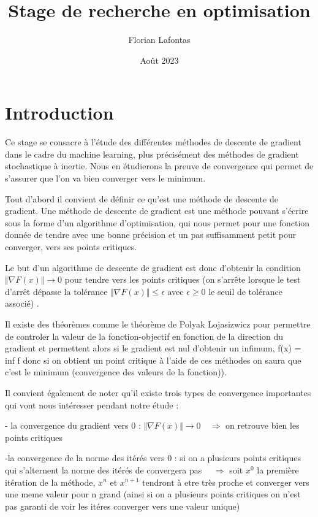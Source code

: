 \documentclass{article}
\title{Stage de recherche en optimisation}
\author{Florian Lafontas}
\date{Août 2023}
\begin{document}
\maketitle
\tableofcontents
\newpage
\section{Introduction}

Ce stage se consacre à l'étude des différentes méthodes de descente de gradient dans le cadre du machine learning, plus précisément des méthodes de gradient stochastique à inertie. Nous en étudierons la preuve de convergence qui permet de s'assurer que l'on va bien converger vers le minimum. 

\bigskip

Tout d'abord il convient de définir ce qu'est une méthode de descente de  gradient. Une méthode de descente de gradient est une méthode pouvant s'écrire sous la forme d'un algorithme d'optimisation, qui nous permet pour une fonction donnée de tendre avec une bonne précision et un pas suffisamment petit pour converger, vers ses points critiques.

\bigskip

Le but d'un algorithme de descente de gradient est donc d'obtenir la condition $ \Vert \nabla F(x)  \Vert \rightarrow 0$ pour tendre vers les points critiques (on s'arrête lorsque le test d'arrêt dépasse la tolérance $ \Vert \nabla F(x)  \Vert \leq \epsilon$ avec $\epsilon \geq 0$ le seuil de tolérance associé) .

\bigskip

Il existe des théorèmes comme le théorème de Polyak Lojasizwicz pour permettre de controler la valeur de la fonction-objectif en fonction de la direction du gradient et permettent alors si le gradient est nul d'obtenir un infimum, f(x) = inf f donc si on obtient un point critique à l'aide de ces méthodes on saura que c’est le minimum (convergence des valeurs de la fonction)).

\bigskip

Il convient également de noter qu'il existe trois types de convergence importantes qui vont nous intéresser pendant notre étude : 

- la convergence du gradient vers 0 :  $ \Vert \nabla F(x)  \Vert \rightarrow 0 \quad \Rightarrow $ on retrouve bien les points critiques

-la convergence de la norme des itérés vers 0 : si on a plusieurs points critiques qui s'alternent la norme des itérés de convergera pas $\quad \Rightarrow$ soit $x^0$ la première itération de la méthode, $x^n$ et $x^{n+1}$ tendront à etre très proche et converger vers une meme valeur pour n grand (ainsi si on a plusieurs points critiques on n'est pas garanti de voir les itéres converger vers une valeur unique)
\end{document}
